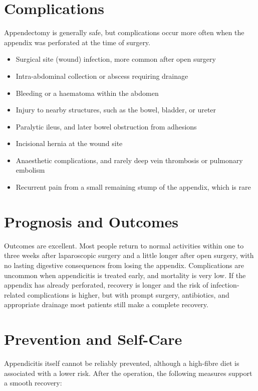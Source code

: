 \section*{Complications}
Appendectomy is generally safe, but complications occur more often when the appendix was perforated at the time of surgery.

\begin{itemize}
    \item Surgical site (wound) infection, more common after open surgery
    \item Intra-abdominal collection or abscess requiring drainage
    \item Bleeding or a haematoma within the abdomen
    \item Injury to nearby structures, such as the bowel, bladder, or ureter
    \item Paralytic ileus, and later bowel obstruction from adhesions
    \item Incisional hernia at the wound site
    \item Anaesthetic complications, and rarely deep vein thrombosis or pulmonary embolism
    \item Recurrent pain from a small remaining stump of the appendix, which is rare
\end{itemize}

\section*{Prognosis and Outcomes}
Outcomes are excellent. Most people return to normal activities within one to three weeks after laparoscopic surgery and a little longer after open surgery, with no lasting digestive consequences from losing the appendix. Complications are uncommon when appendicitis is treated early, and mortality is very low. If the appendix has already perforated, recovery is longer and the risk of infection-related complications is higher, but with prompt surgery, antibiotics, and appropriate drainage most patients still make a complete recovery.

\section*{Prevention and Self-Care}
Appendicitis itself cannot be reliably prevented, although a high-fibre diet is associated with a lower risk. After the operation, the following measures support a smooth recovery:

